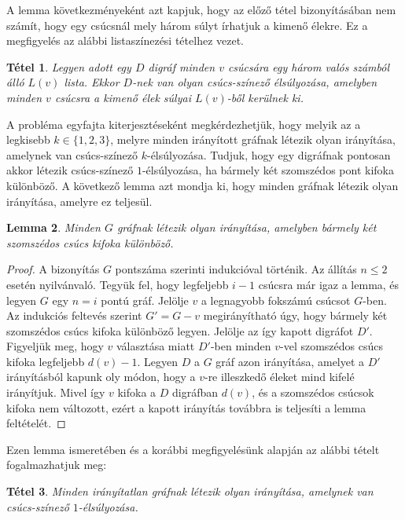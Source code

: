 \documentclass[12pt, a4paper]{report}
\newtheorem{tét}{Tétel}[section]
\newtheorem{lem}[tét]{Lemma}
\theoremstyle{remark}
\theoremstyle{definition}
\begin{document}
A lemma következményeként azt kapjuk, hogy az előző tétel bizonyításában nem számít, hogy egy csúcsnál mely három súlyt írhatjuk a kimenő élekre. Ez a megfigyelés az alábbi listaszínezési tételhez vezet.

\begin{tét}
Legyen adott egy $D$ digráf minden $v$ csúcsára egy három valós számból álló $L(v)$ lista. Ekkor $D$-nek van olyan csúcs-színező élsúlyozása, amelyben minden $v$ csúcsra a kimenő élek súlyai $L(v)$-ből kerülnek ki.
\end{tét}

A probléma egyfajta kiterjesztéseként megkérdezhetjük, hogy melyik az a legkisebb $k \in \lbrace 1, 2, 3 \rbrace$, melyre minden irányított gráfnak létezik olyan irányítása, amelynek van csúcs-színező $k$-élsúlyozása. Tudjuk, hogy egy digráfnak pontosan akkor létezik csúcs-színező $1$-élsúlyozása, ha bármely két szomszédos pont kifoka különböző. A következő lemma azt mondja ki, hogy minden gráfnak létezik olyan irányítása, amelyre ez teljesül.

\begin{lem}
Minden $G$ gráfnak létezik olyan irányítása, amelyben bármely két szomszédos csúcs kifoka különböző.
\end{lem}

\begin{proof}
A bizonyítás $G$ pontszáma szerinti indukcióval történik. Az állítás $n \leq 2$ esetén nyilvánvaló. Tegyük fel, hogy legfeljebb $i - 1$ csúcsra már igaz a lemma, és legyen $G$ egy $n = i$ pontú gráf. Jelölje $v$ a legnagyobb fokszámú csúcsot $G$-ben. Az indukciós feltevés szerint $G' = G - v$ megirányítható úgy, hogy bármely két szomszédos csúcs kifoka különböző legyen. Jelölje az így kapott digráfot $D'$. Figyeljük meg, hogy $v$ választása miatt $D'$-ben minden $v$-vel szomszédos csúcs kifoka legfeljebb $d(v) - 1$. Legyen $D$ a $G$ gráf azon irányítása, amelyet a $D'$ irányításból kapunk oly módon, hogy a $v$-re illeszkedő éleket mind kifelé irányítjuk. Mivel így $v$ kifoka a $D$ digráfban $d(v)$, és a szomszédos csúcsok kifoka nem változott, ezért a kapott irányítás továbbra is teljesíti a lemma feltételét.
\end{proof}

Ezen lemma ismeretében és a korábbi megfigyelésünk alapján az alábbi tételt fogalmazhatjuk meg:

\begin{tét}
Minden irányítatlan gráfnak létezik olyan irányítása, amelynek van csúcs-színező $1$-élsúlyozása.
\end{tét}
\end{document}
